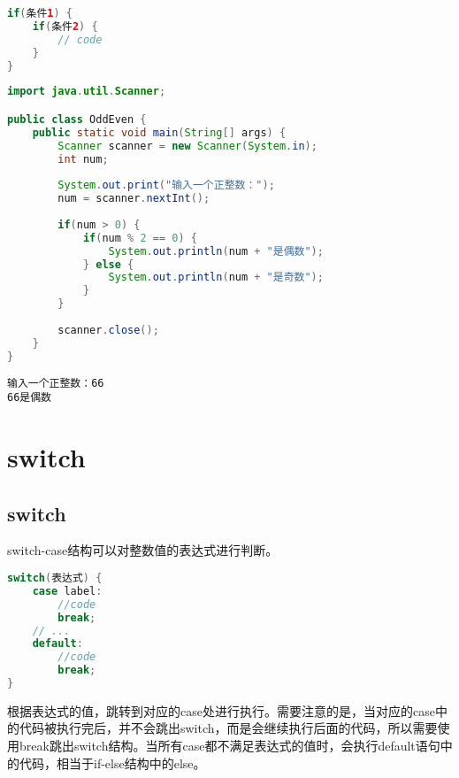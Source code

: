 \vspace{-0.5cm}

\begin{lstlisting}[language=Java]
if(条件1) {
	if(条件2) {
		// code
	}
}
\end{lstlisting}

\vspace{0.5cm}


\begin{lstlisting}[language=Java]
import java.util.Scanner;

public class OddEven {
	public static void main(String[] args) {
		Scanner scanner = new Scanner(System.in);
		int num;
		
		System.out.print("输入一个正整数：");
		num = scanner.nextInt();
		
		if(num > 0) {
			if(num % 2 == 0) {
				System.out.println(num + "是偶数");
			} else {
				System.out.println(num + "是奇数");
			}
		}
		
		scanner.close();
	}
}
\end{lstlisting}

\begin{tcolorbox}
	\begin{verbatim}
输入一个正整数：66
66是偶数
	\end{verbatim}
\end{tcolorbox}

\newpage

\section{switch}

\subsection{switch}

switch-case结构可以对整数值的表达式进行判断。

\vspace{-0.5cm}

\begin{lstlisting}[language=Java]
switch(表达式) {
    case label:
        //code
        break;
    // ...
    default:
        //code
        break;
}
\end{lstlisting}

根据表达式的值，跳转到对应的case处进行执行。需要注意的是，当对应的case中的代码被执行完后，并不会跳出switch，而是会继续执行后面的代码，所以需要使用break跳出switch结构。当所有case都不满足表达式的值时，会执行default语句中的代码，相当于if-else结构中的else。 \\

